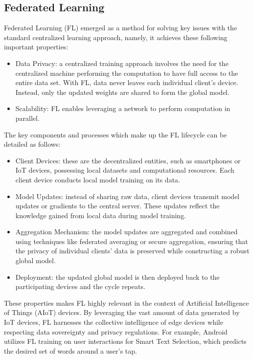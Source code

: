 \documentclass[12pt]{article}
\begin{document}
\subsection{Federated Learning}
Federated Learning (FL) emerged as a method for solving key issues with the standard centralized learning
approach, namely, it achieves these following important properties:
\begin{itemize}
  \item Data Privacy: a centralized training approach involves the need for the centralized
    machine performing the computation to have full access to the entire data set. With FL, data never
    leaves each individual client's device. Instead, only the updated weights are shared to form the
    global model.
  \item Scalability: FL enables leveraging a network to perform computation in parallel.
\end{itemize}

The key components and processes which make up the FL lifecycle can be detailed as follows:
\begin{itemize}
  \item Client Devices: these are the decentralized entities, such as smartphones or IoT devices, possessing local datasets and computational resources. Each client device conducts local model training on its data.
  \item Model Updates: instead of sharing raw data, client devices transmit model updates or gradients to the central server. These updates reflect the knowledge gained from local data during model training.
  \item Aggregation Mechanism: the model updates are aggregated and combined using techniques like federated averaging or secure aggregation, ensuring that the privacy of individual clients' data is preserved while constructing a robust global model.
  \item Deployment: the updated global model is then deployed back to the participating devices and
    the cycle repeats.
\end{itemize}

These properties makes FL highly relevant in the context of Artificial Intelligence of Things
(AIoT) devices. By leveraging the vast amount of data generated by IoT devices, FL harnesses the
collective intelligence of edge devices while respecting data sovereignty and privacy
regulations. For example, Android utilizes FL training on user interactions for Smart Text Selection,
which predicts the desired set of words around a user's tap\cite{android}.\\
\end{document}

